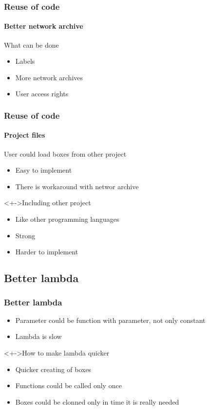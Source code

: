 \documentclass{beamer}
\begin{document}
\begin{frame}
	\frametitle{Reuse of code}
	\framesubtitle{Better network archive}
	\begin{block}{What can be done}
		\begin{itemize}[<+->]
			\item Labels
			\item More network archives
			\item User access rights
		\end{itemize}
	\end{block}
\end{frame}

\begin{frame}
	\frametitle{Reuse of code}
	\framesubtitle{Project files}
	\begin{block}{User could load boxes from other project}
		\begin{itemize}[<+->]
			\item Easy to implement
			\item There is workaround with networ archive
		\end{itemize}
	\end{block}
	\begin{block}<+->{Including other project}
		\begin{itemize}[<+->]
			\item Like other programming languages
			\item Strong
			\item Harder to implement
		\end{itemize}
	\end{block}
\end{frame}

\subsection{Better lambda}
\begin{frame}
	\frametitle{Better lambda}
	\begin{block}{}
		\begin{itemize}[<+->]
			\item Parameter could be function with parameter, not only constant
			\item Lambda is slow
		\end{itemize}
	\end{block}
	\begin{block}<+->{How to make lambda quicker}
		\begin{itemize}[<+->]
			\item Quicker creating of boxes
			\item Functions could be called only once
			\item Boxes could be clonned only in time it is really needed
		\end{itemize}
	\end{block}
\end{frame}
\end{document}
